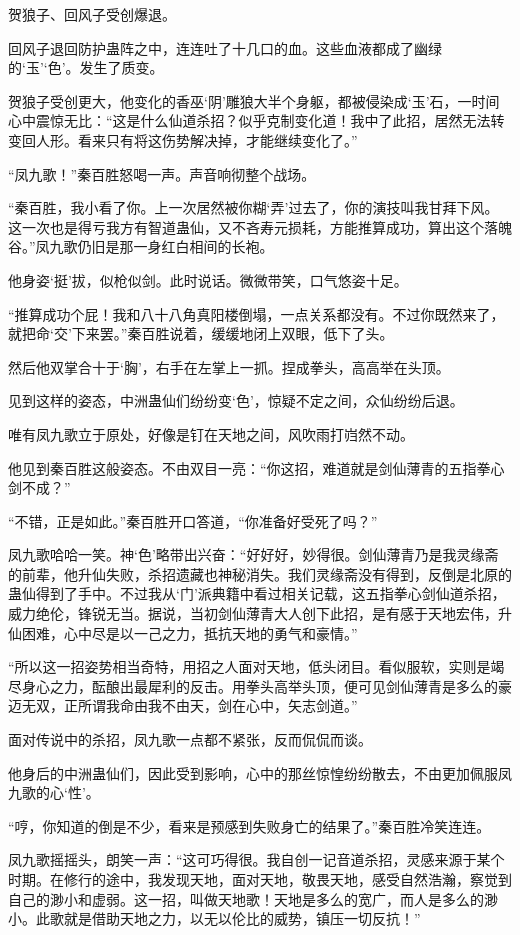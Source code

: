 \begin{this_body}
贺狼子、回风子受创爆退。

回风子退回防护蛊阵之中，连连吐了十几口的血。这些血液都成了幽绿的‘玉’‘色’。发生了质变。

贺狼子受创更大，他变化的香巫‘阴’雕狼大半个身躯，都被侵染成‘玉’石，一时间心中震惊无比：“这是什么仙道杀招？似乎克制变化道！我中了此招，居然无法转变回人形。看来只有将这伤势解决掉，才能继续变化了。”

“凤九歌！”秦百胜怒喝一声。声音响彻整个战场。

“秦百胜，我小看了你。上一次居然被你糊‘弄’过去了，你的演技叫我甘拜下风。这一次也是得亏我方有智道蛊仙，又不吝寿元损耗，方能推算成功，算出这个落魄谷。”凤九歌仍旧是那一身红白相间的长袍。

他身姿‘挺’拔，似枪似剑。此时说话。微微带笑，口气悠姿十足。

“推算成功个屁！我和八十八角真阳楼倒塌，一点关系都没有。不过你既然来了，就把命‘交’下来罢。”秦百胜说着，缓缓地闭上双眼，低下了头。

然后他双掌合十于‘胸’，右手在左掌上一抓。捏成拳头，高高举在头顶。

见到这样的姿态，中洲蛊仙们纷纷变‘色’，惊疑不定之间，众仙纷纷后退。

唯有凤九歌立于原处，好像是钉在天地之间，风吹雨打岿然不动。

他见到秦百胜这般姿态。不由双目一亮：“你这招，难道就是剑仙薄青的五指拳心剑不成？”

“不错，正是如此。”秦百胜开口答道，“你准备好受死了吗？”

凤九歌哈哈一笑。神‘色’略带出兴奋：“好好好，妙得很。剑仙薄青乃是我灵缘斋的前辈，他升仙失败，杀招遗藏也神秘消失。我们灵缘斋没有得到，反倒是北原的蛊仙得到了手中。不过我从‘门’派典籍中看过相关记载，这五指拳心剑仙道杀招，威力绝伦，锋锐无当。据说，当初剑仙薄青大人创下此招，是有感于天地宏伟，升仙困难，心中尽是以一己之力，抵抗天地的勇气和豪情。”

“所以这一招姿势相当奇特，用招之人面对天地，低头闭目。看似服软，实则是竭尽身心之力，酝酿出最犀利的反击。用拳头高举头顶，便可见剑仙薄青是多么的豪迈无双，正所谓我命由我不由天，剑在心中，矢志剑道。”

面对传说中的杀招，凤九歌一点都不紧张，反而侃侃而谈。

他身后的中洲蛊仙们，因此受到影响，心中的那丝惊惶纷纷散去，不由更加佩服凤九歌的心‘性’。

“哼，你知道的倒是不少，看来是预感到失败身亡的结果了。”秦百胜冷笑连连。

凤九歌摇摇头，朗笑一声：“这可巧得很。我自创一记音道杀招，灵感来源于某个时期。在修行的途中，我发现天地，面对天地，敬畏天地，感受自然浩瀚，察觉到自己的渺小和虚弱。这一招，叫做天地歌！天地是多么的宽广，而人是多么的渺小。此歌就是借助天地之力，以无以伦比的威势，镇压一切反抗！”


\end{this_body}
